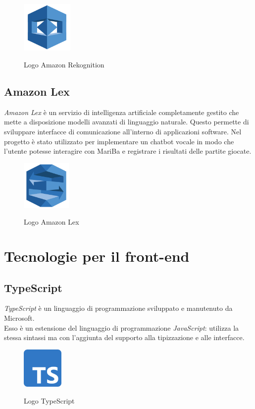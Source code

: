 	\begin{figure}[H]
		\centering
		\includegraphics[width=2.5cm]{immagini/rekognition.png} \\
		\caption{\label{fig:logo_rekognition} Logo Amazon Rekognition}
	\end{figure}
	
	\subsection{Amazon Lex}
	\emph{Amazon Lex} è un servizio di intelligenza artificiale completamente gestito che mette a disposizione modelli avanzati di linguaggio naturale. Questo permette di sviluppare interfacce di comunicazione all'interno di applicazioni software. Nel progetto è stato utilizzato per implementare un \gls{chatbot} vocale in modo che 
	l'utente potesse interagire con MariBa e registrare i risultati delle partite giocate.
	
	\begin{figure}[H]
		\centering
		\includegraphics[width=2.4cm]{immagini/lex.png} \\
		\caption{\label{fig:logo_lex} Logo Amazon Lex}
	\end{figure}

\section{Tecnologie per il front-end}
	\subsection{TypeScript}
	\emph{TypeScript} è un linguaggio di programmazione sviluppato e manutenuto da Microsoft. \\
	Esso è un estensione del linguaggio di programmazione \emph{JavaScript}: utilizza la stessa sintassi ma con l'aggiunta del supporto alla tipizzazione e alle interfacce. 
	
	\begin{figure}[H]
		\centering
		\includegraphics[width=2cm]{immagini/typescript.png} \\
		\caption{\label{fig:logo_typescript} Logo TypeScript}
	\end{figure}

